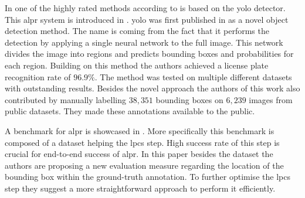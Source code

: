 




In one of the highly rated methods according to \cite{survOnMet} is based on the \gls{yolo} detector.
This \gls{alpr} system is introduced in \cite{DBLP:journals/corr/abs-1909-01754}. \gls{yolo} was first published in \cite{redmon2016look} as a novel object detection method.
The name is coming from the fact that it performs the detection by applying a single neural network to the full image.
This network divides the image into regions and predicts bounding boxes and probabilities for each region. 
Building on this method the authors achieved a license plate recognition rate of $96.9\%$.
The method was tested on multiple different datasets with outstanding results. 
Besides the novel approach the authors of this work also contributed by manually labelling $38,351$ bounding boxes on $6,239$ images from public datasets.
They made these annotations available to the public.

A benchmark for \gls{alpr} is showcased in \cite{DBLP:journals/corr/GoncalvesSMS16}. More specifically this benchmark is composed of a dataset helping the \gls{lpcs} step. High success rate of this step is crucial for end-to-end success of \gls{alpr}. In this paper besides the dataset the authors are proposing a new evaluation measure regarding the location of the bounding box within the ground-truth annotation. To further optimise the \gls{lpcs} step they suggest a more straightforward approach to perform it efficiently.









